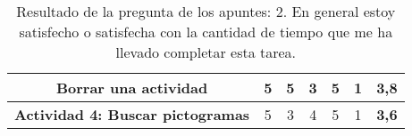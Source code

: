 \begin{table}[H]
{\begin{tabular}{c|cccccc|}
            \multicolumn{1}{|c|}{\textbf{Borrar una actividad}}            & \multicolumn{1}{c|}{5}                                                                                                                                                                 & \multicolumn{1}{c|}{5}                  & \multicolumn{1}{c|}{3}                  & \multicolumn{1}{c|}{5}                  & \multicolumn{1}{c|}{1}                  & \textbf{3,8}                        \\ \hline
            \multicolumn{1}{|c|}{\textbf{Actividad 4: Buscar pictogramas}} & \multicolumn{1}{c|}{5}                                                                                                                                                                 & \multicolumn{1}{c|}{3}                  & \multicolumn{1}{c|}{4}                  & \multicolumn{1}{c|}{5}                  & \multicolumn{1}{c|}{1}                  & \textbf{3,6}                        \\ \hline
        \end{tabular}%
    }
    \caption{Resultado de la pregunta de los apuntes: 2. En general estoy satisfecho o satisfecha con la cantidad de tiempo que me ha llevado completar esta tarea.}
    \label{tab:pregunta2Apunte}
\end{table}

